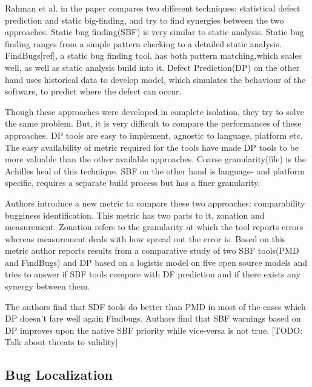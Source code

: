 \documentclass[10pt, conference, compsocconf]{IEEEtran}
\begin{document}
Rahman et al. \cite{rahman2014comparing} in the paper compares two different techniques: statistical defect prediction and static big-finding, and try to find synergies between the two approaches. Static bug finding(SBF) is very similar to static analysis. Static bug finding ranges from a simple pattern checking to a detailed static analysis. FindBugs[ref], a static bug finding tool, has both pattern matching,which scales well, as well as static analysis build into it. Defect Prediction(DP) on the other hand uses historical data to develop model, which simulates the behaviour of the software, to predict where the defect can occur. 

Though these approaches were developed in complete isolation, they try to solve the same problem. But, it is very difficult to compare the performances of these approaches. DP tools are easy to implement, agnostic to language, platform etc. The easy availability of metric required for the tools have made DP tools to be more valuable than the other available approaches. Coarse granularity(file) is the Achilles heal of this technique. SBF on the other hand is language- and platform specific, requires a separate build process but has a finer granularity.

Authors introduce a new metric to compare these two approaches: comparability bugginess identification. This metric has two parts to it, zonation and measurement. Zonation refers to the granularity at which the tool reports errors whereas measurement deals with how spread out the error is. Based on this metric author reports results from a comparative study of two SBF tools(PMD and FindBugs) and DP based on a logistic model on five open source models and tries to answer if SBF tools compare with DF prediction and if there exists any synergy between them.

The authors find that SDF tools do better than PMD in most of the cases which DP doesn’t fare well again Findbugs. Authors find that SBF warnings based on DP improves upon the native SBF priority while vice-versa is not true. [TODO: Talk about threats to validity]

\subsection{Bug Localization}
\end{document}
